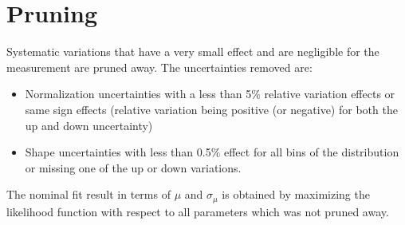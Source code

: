 \section{Pruning}
Systematic variations that have a very small effect and are negligible for the measurement are pruned away. The uncertainties removed are:
  \begin{itemize}
   \item  Normalization uncertainties with a less than 5$\%$ relative variation effects or same sign effects (relative variation being positive (or negative) for both the up and down uncertainty)
   \item  Shape uncertainties with less than 0.5$\%$ effect for all bins of the distribution or missing one of the up or down variations.
    \end{itemize}
    
The nominal fit result in terms of $\mu$ and $\sigma_{\mu}$ is obtained by maximizing the likelihood function with respect to all parameters which was not pruned away.



